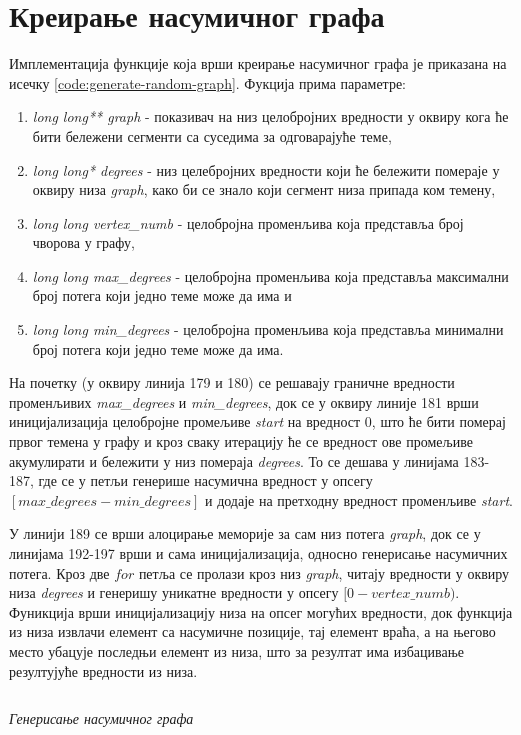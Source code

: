 \section{Креирање насумичног графа}
Имплементација функције која врши креирање насумичног графа је приказана на исечку \ref{code:generate-random-graph}. Фукција  прима параметре:
\begin{enumerate}
    \item \textit{long long** graph} - показивач на низ целобројних вредности у оквиру кога ће бити бележени сегменти са суседима за одговарајуће теме,
    \item \textit{long long* degrees} - низ целебројних вредности који ће бележити помераје у оквиру низа \textit{graph}, како би се знало који сегмент низа припада ком темену,
    \item \textit{long long vertex\_numb} - целобројна променљива која представља број чворова у графу,
    \item \textit{long long max\_degrees} - целобројна променљива која представља максимални број потега који једно теме може да има и
    \item \textit{long long min\_degrees} - целобројна променљива која представља минимални број потега који једно теме може да има.
\end{enumerate}
На почетку (у оквиру линија 179 и 180) се решавају граничне вредности променљивих \textit{max\_degrees} и \textit{min\_degrees}, док се у оквиру линије 181 врши иницијализација целобројне промељиве \textit{start} на вредност 0, што ће бити померај првог темена у графу и кроз сваку итерацију ће се вредност ове промељиве акумулирати и бележити у низ помераја \textit{degrees}. То се дешава у линијама 183-187, где се у петљи генерише насумична вредност у опсегу $[max\_degrees-min\_degrees]$ и додаје на претходну вредност променљиве \textit{start}.

\par
У линији 189 се врши алоцирање меморије за сам низ потега \textit{graph}, док се у линијама 192-197 врши и сама иницијализација, односно генерисање насумичних потега. Кроз две $for$ петља се пролази кроз низ \textit{graph}, читају вредности у оквиру низа \textit{degrees} и генеришу уникатне вредности у опсегу $[0-vertex\_numb)$. Фуникција  врши иницијализацију низа на опсег могућих вредности, док функција  из низа извлачи елемент са насумичне позиције, тај елемент враћа, а на његово место убацује последњи елемент из низа, што за резултат има избацивање резултујуће вредности из низа.

\begin{listing}[H]
\inputminted[fontsize={\fontsize{7}{6}\selectfont},firstline=160,lastline=202]{c}{kodovi/bfs-dist-general-1d.c}
\caption{\textit{Генерисање насумичног графа}}
\label{code:generate-random-graph}
\end{listing}